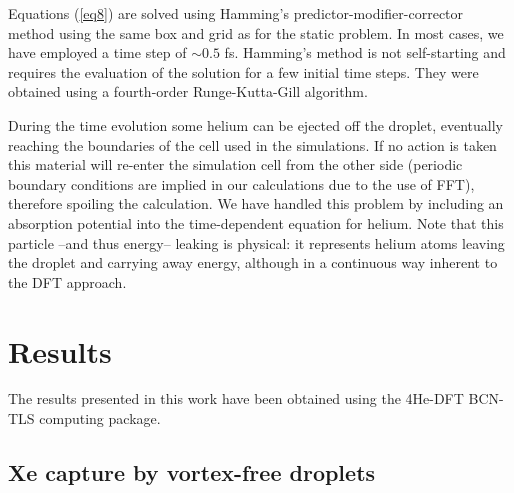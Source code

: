 Equations (\ref{eq8}) are solved 
using Hamming's predictor-modifier-corrector method\cite{Ral60}
using the same box and grid as for the static problem. 
In most cases, we have employed a time step of $\sim 0.5$ fs. 
Hamming's method is not self-starting and requires the evaluation of 
the solution for a few initial time steps. They were obtained using a 
fourth-order Runge-Kutta-Gill algorithm.\cite{Ral60}

During the time evolution some helium can be ejected off the droplet,  
eventually reaching the boundaries of the cell used in the simulations. 
If no action is taken this material will re-enter the simulation cell
from the other side (periodic boundary conditions are implied in
our calculations due to the use of FFT), therefore
 spoiling the calculation. We have
handled this problem by including an absorption potential
into the time-dependent equation for helium.\cite{Mat11a}
Note that this particle --and thus energy-- leaking is physical: 
it represents  helium atoms leaving the droplet and carrying away energy,
although in a continuous way inherent to  the  DFT approach. 

\section{Results}

The results presented in this work have been obtained using the  4He-DFT BCN-TLS computing package.\cite{Pi17}

\subsection{Xe capture by vortex-free droplets}

